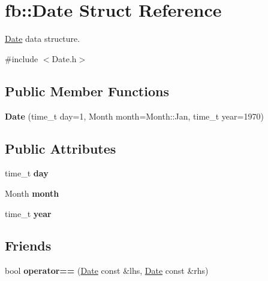 \hypertarget{structfb_1_1_date}{\section{fb\+:\+:Date Struct Reference}
\label{structfb_1_1_date}
}


\hyperlink{structfb_1_1_date}{Date} data structure.  




{\ttfamily \#include $<$Date.\+h$>$}

\subsection*{Public Member Functions}
\begin{DoxyCompactItemize}
\item 
\hypertarget{structfb_1_1_date_afd4b4fd1e4f19641bd5af1814e28740e}{{\bfseries Date} (time\+\_\+t day=1, Month month=Month\+::\+Jan, time\+\_\+t year=1970)}\label{structfb_1_1_date_afd4b4fd1e4f19641bd5af1814e28740e}

\end{DoxyCompactItemize}
\subsection*{Public Attributes}
\begin{DoxyCompactItemize}
\item 
\hypertarget{structfb_1_1_date_aca51bed7ced0ec90a00380daca6d1774}{time\+\_\+t {\bfseries day}}\label{structfb_1_1_date_aca51bed7ced0ec90a00380daca6d1774}

\item 
\hypertarget{structfb_1_1_date_a67d62b4fd9c0050ffec876eb454719bc}{Month {\bfseries month}}\label{structfb_1_1_date_a67d62b4fd9c0050ffec876eb454719bc}

\item 
\hypertarget{structfb_1_1_date_a8b6c7c2160099c91acb1b573b4a001b8}{time\+\_\+t {\bfseries year}}\label{structfb_1_1_date_a8b6c7c2160099c91acb1b573b4a001b8}

\end{DoxyCompactItemize}
\subsection*{Friends}
\begin{DoxyCompactItemize}
\item 
\hypertarget{structfb_1_1_date_a57efb3a718b26396d53254439343a4ce}{bool {\bfseries operator==} (\hyperlink{structfb_1_1_date}{Date} const \&lhs, \hyperlink{structfb_1_1_date}{Date} const \&rhs)}\label{structfb_1_1_date_a57efb3a718b26396d53254439343a4ce}

\end{DoxyCompactItemize}


